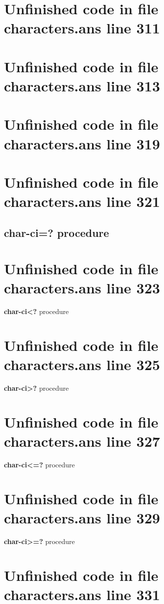 \documentclass[twoside,9pt]{report}
\begin{document}
\section{Unfinished code in file characters.ans line 311}
\section{Unfinished code in file characters.ans line 313}
\section{Unfinished code in file characters.ans line 319}
\section{Unfinished code in file characters.ans line 321}
\subsection{char-ci=? procedure}
\label{char-ci=?-procedure}
\section{Unfinished code in file characters.ans line 323}

\noindent \textbf{char-ci<?} procedure

\section{Unfinished code in file characters.ans line 325}

\noindent \textbf{char-ci>?} procedure

\section{Unfinished code in file characters.ans line 327}

\noindent \textbf{char-ci<=?} procedure

\section{Unfinished code in file characters.ans line 329}

\noindent \textbf{char-ci>=?} procedure

\section{Unfinished code in file characters.ans line 331}
\end{document}
